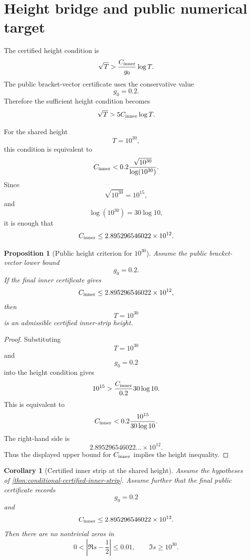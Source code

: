 \documentclass[11pt]{article}
\newtheorem{proposition}[theorem]{Proposition}
\newtheorem{corollary}[theorem]{Corollary}
\newcommand{\gev}{g_0}
\newcommand{\Cinner}{C_{\rm inner}}
\begin{document}
\section{Height bridge and public numerical target}
\label{sec:height-bridge}

The certified height condition is
\[
        \sqrt T
        >
        \frac{\Cinner}{\gev}
        \log T.
\]
The public bracket-vector certificate uses the conservative value
\[
        \gev=0.2.
\]
Therefore the sufficient height condition becomes
\[
        \sqrt T
        >
        5\Cinner\log T.
\]

For the shared height
\[
        T=10^{30},
\]
this condition is equivalent to
\[
        \Cinner
        <
        0.2\frac{\sqrt{10^{30}}}{\log(10^{30})}.
\]
Since
\[
        \sqrt{10^{30}}=10^{15},
\]
and
\[
        \log(10^{30})=30\log10,
\]
it is enough that
\[
        \Cinner
        \le
        2.895296546022\times10^{12}.
\]

\begin{proposition}[Public height criterion for \(10^{30}\)]
\label{prop:height-criterion-1e30}
Assume the public bracket-vector lower bound
\[
        \gev=0.2.
\]
If the final inner certificate gives
\[
        \Cinner
        \le
        2.895296546022\times10^{12},
\]
then
\[
        T=10^{30}
\]
is an admissible certified inner-strip height.
\end{proposition}

\begin{proof}
Substituting
\[
        T=10^{30}
\]
and
\[
        \gev=0.2
\]
into the height condition gives
\[
        10^{15}
        >
        \frac{\Cinner}{0.2}
        30\log10.
\]
This is equivalent to
\[
        \Cinner
        <
        0.2\frac{10^{15}}{30\log10}.
\]
The right-hand side is
\[
        2.895296546022\ldots\times10^{12}.
\]
Thus the displayed upper bound for \(\Cinner\) implies the height inequality.
\end{proof}

\begin{corollary}[Certified inner strip at the shared height]
\label{cor:inner-strip-shared-height}
Assume the hypotheses of
\cref{thm:conditional-certified-inner-strip}.  Assume further that the final
public certificate records
\[
        \gev=0.2
\]
and
\[
        \Cinner
        \le
        2.895296546022\times10^{12}.
\]
Then there are no nontrivial zeros in
\[
        0<\left|\Re s-\frac12\right|\le0.01,
        \qquad
        \Im s\ge10^{30}.
\]
\end{corollary}
\end{document}
